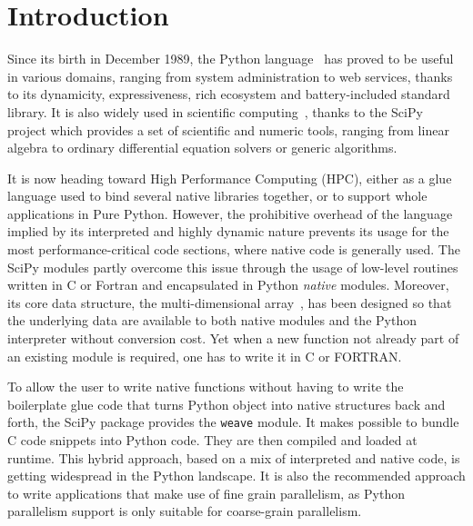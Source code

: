 \documentclass[conference]{IEEEtran}
\begin{document}
%
\section{Introduction}

Since its birth in December 1989, the Python language~\cite{rossum97} has proved
to be useful in various domains, ranging from system administration to web
services, thanks to its dynamicity, expressiveness, rich ecosystem and
battery-included standard library. It is also widely used in scientific
computing~\cite{Oliphant2007}, thanks to the SciPy~\cite{scipy} project
which provides a set of scientific and numeric tools, ranging from linear algebra to ordinary differential equation solvers or generic algorithms.

It is now heading toward High Performance Computing (HPC), either as a glue
language used to bind several native libraries together, or to support whole
applications in Pure Python. However, the prohibitive overhead of the language
implied by its interpreted and highly dynamic nature prevents its usage for the
most performance-critical code sections, where native code is generally used.
The SciPy modules partly overcome this issue through the usage of low-level 
routines written in C or Fortran and encapsulated in Python \emph{native} 
modules. Moreover, its core data structure, the multi-dimensional
array~\cite{numpyarray2011}, has been designed so that the underlying data are
available to both native modules and the Python interpreter without conversion
cost. Yet when a new function not already part of an existing module is
required, one has to write it in C or FORTRAN.

To allow the user to write native functions without having to write the boilerplate glue code that turns Python object into native structures back and
forth, the SciPy package provides the \texttt{weave} module. It makes
possible to bundle C code snippets into Python code. They are then compiled and 
loaded at runtime. This hybrid approach, based on a mix of interpreted and
native code, is getting widespread in the Python landscape. It is also the
recommended approach to write applications that make use of fine grain
parallelism, as Python parallelism support is only suitable for coarse-grain
parallelism.
\end{document}
